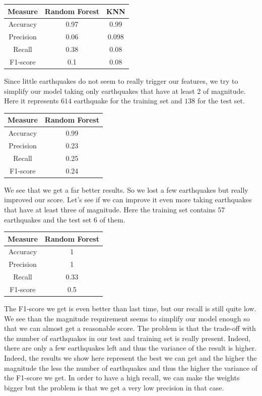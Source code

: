 \documentclass[10pt,conference,compsocconf]{IEEEtran}
\begin{document}
\begin{center}
 \begin{tabular}{||c c c||}
 \hline
 Measure & Random Forest & KNN \\ [0.5ex]
 \hline\hline
 Accuracy & 0.97 & 0.99 \\
 \hline
 Precision & 0.06 & 0.098 \\
 \hline
 Recall & 0.38 & 0.08 \\
 \hline
 F1-score & 0.1 & 0.08 \\ [1ex]
 \hline
\end{tabular}
\end{center}

Since little earthquakes do not seem to really trigger our features, we try to simplify our model taking only earthquakes that have at least 2 of magnitude. Here it represents $614$ earthquake for the training set and $138$ for the test set.

\begin{center}
 \begin{tabular}{||c c||}
 \hline
 Measure & Random Forest \\ [0.5ex]
 \hline\hline
 Accuracy & 0.99 \\
 \hline
 Precision & 0.23 \\
 \hline
 Recall & 0.25 \\
 \hline
 F1-score & 0.24 \\ [1ex]
 \hline
\end{tabular}
\end{center}

We see that we get a far better results. So we lost a few earthquakes but really improved our score. Let's see if we can improve it even more taking earthquakes that have at least three of magnitude. Here the training set contains $57$ earthquakes and the test set $6$ of them.

\begin{center}
 \begin{tabular}{||c c||}
 \hline
 Measure & Random Forest \\ [0.5ex]
 \hline\hline
 Accuracy & 1 \\
 \hline
 Precision & 1 \\
 \hline
 Recall & 0.33 \\
 \hline
 F1-score & 0.5 \\ [1ex]
 \hline
\end{tabular}
\end{center}

The F1-score we get is even better than last time, but our recall is still quite low. We see than the magnitude requirement seems to simplify our model enough so that we can almost get a reasonable score. The problem is that the trade-off with the number of earthquakes in our test and training set is really present. Indeed, there are only a few earthquakes left and thus the variance of the result is higher. Indeed, the results we show here represent the best we can get and the higher the magnitude the less the number of earthquakes and thus the higher the variance of the F1-score we get. In order to have a high recall, we can make the weights bigger but the problem is that we get a very low precision in that case.
\end{document}
